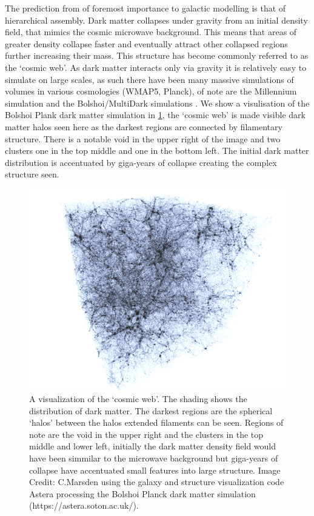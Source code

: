 The prediction from \LCDM of foremost importance to galactic modelling is that of hierarchical assembly. Dark matter collapses under gravity from an initial density field, that mimics the cosmic microwave background. This means that areas of greater density collapse faster and eventually attract other collapsed regions further increasing their mass. This structure has become commonly referred to as the `cosmic web'. As dark matter interacts only via gravity it is relatively easy to simulate on large scales, as such there have been many massive simulations of \LCDM volumes in various cosmologies (WMAP5, Planck), of note are the Millennium simulation \citep{Boylan-Kolchin2009ResolvingSimulation} and the Bolshoi/MultiDark simulations \citep{Klypin2016}. We show a visulisation of the Bolshoi Plank dark matter simulation in \ref{fig:DMStruct}, the `cosmic web' is made visible dark matter halos seen here as the darkest regions are connected by filamentary structure. There is a notable void in the upper right of the image and two clusters one in the top middle and one in the bottom left. The initial dark matter distribution is accentuated by giga-years of collapse creating the complex structure seen.

\begin{figure}[h]
	\centering
	\includegraphics[width = \linewidth]{Figures/Chapter1/DMStruct.png}
    \caption{A visualization of the `cosmic web'. The shading shows the distribution of dark matter. The darkest regions are the spherical `halos' between the halos extended filaments can be seen. Regions of note are the void in the upper right and the clusters in the top middle and lower left, initially the dark matter density field would have been simmilar to the microwave background but giga-years of collapse have accentuated small features into large structure. Image Credit: C.Marsden using the galaxy and structure visualization code Astera processing the Bolshoi Planck dark matter simulation (https://astera.soton.ac.uk/).}
	\label{fig:DMStruct}
\end{figure}


